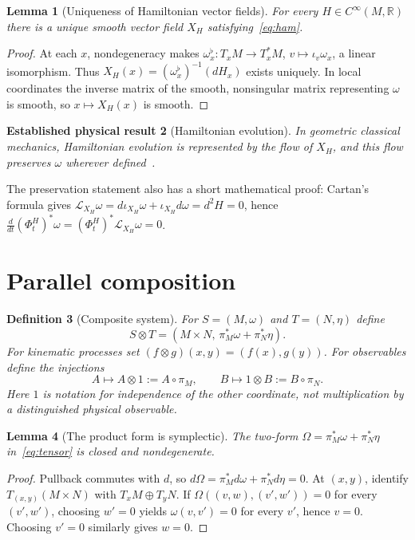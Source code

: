 \documentclass[11pt]{article}
\newtheorem{definition}{Definition}[section]
\newtheorem{lemma}[definition]{Lemma}
\newtheorem{established}[definition]{Established physical result}
\newcommand{\R}{\mathbb R}
\begin{document}
\begin{lemma}[Uniqueness of Hamiltonian vector fields]
For every $H\in C^\infty(M,\R)$ there is a unique smooth vector field $X_H$ satisfying~\eqref{eq:ham}.
\end{lemma}
\begin{proof}
At each $x$, nondegeneracy makes $\omega_x^\flat:T_xM\to T_x^*M$, $v\mapsto\iota_v\omega_x$, a linear isomorphism.  Thus $X_H(x)=(\omega_x^\flat)^{-1}(dH_x)$ exists uniquely.  In local coordinates the inverse matrix of the smooth, nonsingular matrix representing $\omega$ is smooth, so $x\mapsto X_H(x)$ is smooth.
\end{proof}

\begin{established}[Hamiltonian evolution]
In geometric classical mechanics, Hamiltonian evolution is represented by the flow of $X_H$, and this flow preserves $\omega$ wherever defined~\cite[Chs.~3--5]{AbrahamMarsden1978,MarsdenRatiu1999}.
\end{established}
The preservation statement also has a short mathematical proof: Cartan's formula gives $\mathcal L_{X_H}\omega=d\iota_{X_H}\omega+\iota_{X_H}d\omega=d^2H=0$, hence $\frac d{dt}(\Phi_t^H)^*\omega=(\Phi_t^H)^*\mathcal L_{X_H}\omega=0$.

\section{Parallel composition}

\begin{definition}[Composite system]
For $S=(M,\omega)$ and $T=(N,\eta)$ define
\begin{equation}\label{eq:tensor}
 S\otimes T=(M\times N,\,\pi_M^*\omega+\pi_N^*\eta).
\end{equation}
For kinematic processes set $(f\otimes g)(x,y)=(f(x),g(y))$.  For observables define the injections
\[
 A\mapsto A\otimes1:=A\circ\pi_M,
 \qquad B\mapsto1\otimes B:=B\circ\pi_N.
\]
Here $1$ is notation for independence of the other coordinate, not multiplication by a distinguished physical observable.
\end{definition}

\begin{lemma}[The product form is symplectic]
The two-form $\Omega=\pi_M^*\omega+\pi_N^*\eta$ in~\eqref{eq:tensor} is closed and nondegenerate.
\end{lemma}
\begin{proof}
Pullback commutes with $d$, so $d\Omega=\pi_M^*d\omega+\pi_N^*d\eta=0$.  At $(x,y)$, identify $T_{(x,y)}(M\times N)$ with $T_xM\oplus T_yN$.  If $\Omega((v,w),(v',w'))=0$ for every $(v',w')$, choosing $w'=0$ yields $\omega(v,v')=0$ for every $v'$, hence $v=0$.  Choosing $v'=0$ similarly gives $w=0$.
\end{proof}
\end{document}
